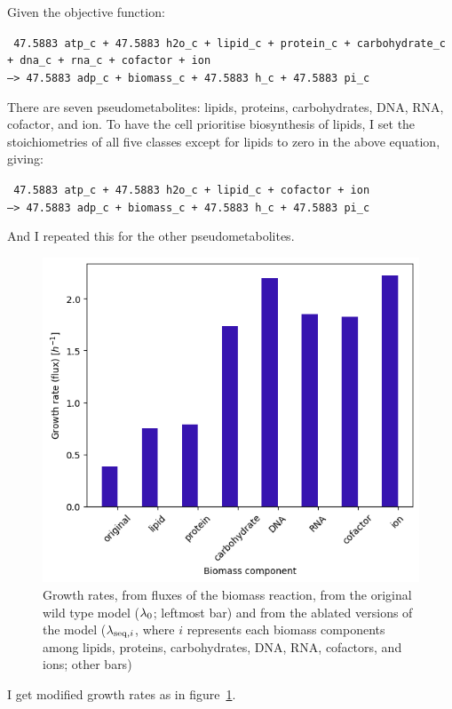 Given the objective function:

\texttt{
  47.5883 atp\_c + 47.5883 h2o\_c + lipid\_c + protein\_c + carbohydrate\_c\\
  + dna\_c + rna\_c + cofactor + ion \\
  --> 47.5883 adp\_c + biomass\_c + 47.5883 h\_c + 47.5883 pi\_c
}

There are seven pseudometabolites: lipids, proteins, carbohydrates, DNA, RNA, cofactor, and ion.
To have the cell prioritise biosynthesis of lipids, I set the stoichiometries of all five classes except for lipids to zero in the above equation, giving:

\texttt{
  47.5883 atp\_c + 47.5883 h2o\_c + lipid\_c + cofactor + ion \\
  --> 47.5883 adp\_c + biomass\_c + 47.5883 h\_c + 47.5883 pi\_c
}

And I repeated this for the other pseudometabolites.

\begin{figure}
  \centering
  \includegraphics[width=.9\linewidth]{ablation_example_fluxes.png}
  \caption{
    Growth rates, from fluxes of the biomass reaction, from the original wild type model ($\lambda_{0}$; leftmost bar) and from the ablated versions of the model ($\lambda_{\mathrm{seq},i}$, where $i$ represents each biomass components among lipids, proteins, carbohydrates, DNA, RNA, cofactors, and ions; other bars)
  }
  \label{fig:model-ablate-fluxes}
\end{figure}

I get modified growth rates as in figure~\ref{fig:model-ablate-fluxes}.

